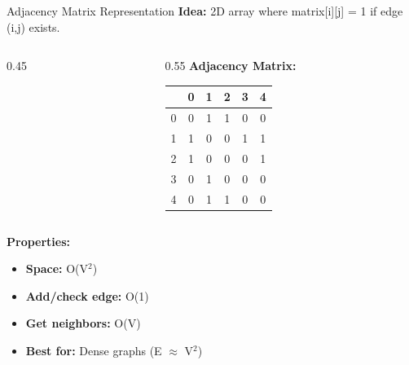 \documentclass[aspectratio=169]{beamer}
\begin{document}
\begin{frame}{Adjacency Matrix Representation}
  \textbf{Idea:} 2D array where matrix[i][j] = 1 if edge (i,j) exists.

  \vspace{0.3cm}
  \begin{columns}[T]
    \begin{column}{0.45\textwidth}
      \begin{center}
      \end{center}
    \end{column}

    \begin{column}{0.55\textwidth}
      \textbf{Adjacency Matrix:}
      \begin{center}
        \small
        \begin{tabular}{c|ccccc}
          & 0 & 1 & 2 & 3 & 4 \\
          \hline
          0 & 0 & 1 & 1 & 0 & 0 \\
          1 & 1 & 0 & 0 & 1 & 1 \\
          2 & 1 & 0 & 0 & 0 & 1 \\
          3 & 0 & 1 & 0 & 0 & 0 \\
          4 & 0 & 1 & 1 & 0 & 0 \\
        \end{tabular}
      \end{center}
    \end{column}
  \end{columns}

  \vspace{0.3cm}
  \textbf{Properties:}
  \begin{itemize}
    \item \textbf{Space:} O(V$^2$)
    \item \textbf{Add/check edge:} O(1)
    \item \textbf{Get neighbors:} O(V)
    \item \textbf{Best for:} Dense graphs (E $\approx$ V$^2$)
  \end{itemize}
\end{frame}
\end{document}
